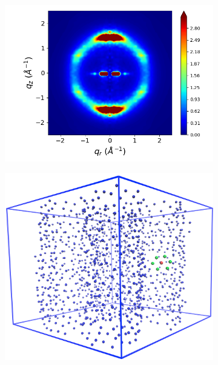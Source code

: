 \documentclass[journal=jpcbfk,manuscript=article]{achemso}
\begin{document}
\begin{figure}[!htb]
\begin{subfigure}{0.32\linewidth}
	\includegraphics[width=\textwidth]{tails_rzplot_jet.png}
	\caption{}\label{fig:tails_rzplot}
  \end{subfigure}
  \begin{subfigure}[t]{0.32\linewidth}
    \centering
	\includegraphics[width=\textwidth]{centroids_box.png}
  \caption{}\label{fig:centroids}
  \end{subfigure}
  \begin{subfigure}[t]{0.32\linewidth}
        \centering

\end{subfigure}
\end{figure}
\end{document}
